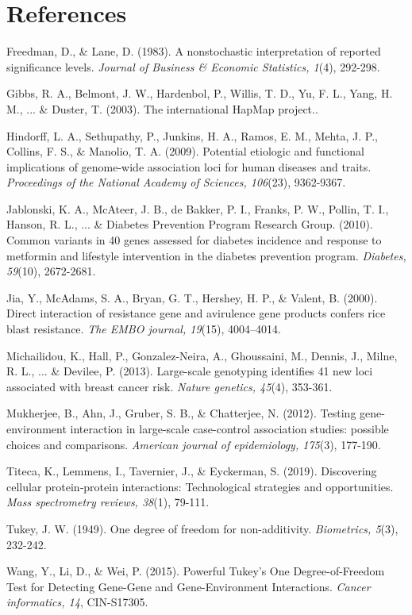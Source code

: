 \documentclass[12pt]{article}
\begin{document}
\section{References}
Freedman, D., \& Lane, D. (1983). A nonstochastic interpretation of reported significance levels. \textit{Journal of Business \& Economic Statistics, 1}(4), 292-298.

Gibbs, R. A., Belmont, J. W., Hardenbol, P., Willis, T. D., Yu, F. L., Yang, H. M., ... \& Duster, T. (2003). The international HapMap project..

Hindorff, L. A., Sethupathy, P., Junkins, H. A., Ramos, E. M., Mehta, J. P., Collins, F. S., \& Manolio, T. A. (2009). Potential etiologic and functional implications of genome-wide association loci for human diseases and traits. \textit{Proceedings of the National Academy of Sciences, 106}(23), 9362-9367.

Jablonski, K. A., McAteer, J. B., de Bakker, P. I., Franks, P. W., Pollin, T. I., Hanson, R. L., ... \& Diabetes Prevention Program Research Group. (2010). Common variants in 40 genes assessed for diabetes incidence and response to metformin and lifestyle intervention in the diabetes prevention program. \textit{Diabetes, 59}(10), 2672-2681.

Jia, Y., McAdams, S. A., Bryan, G. T., Hershey, H. P., \& Valent, B. (2000). Direct interaction of resistance gene and avirulence gene products confers rice blast resistance. \textit{The EMBO journal, 19}(15), 4004–4014.

Michailidou, K., Hall, P., Gonzalez-Neira, A., Ghoussaini, M., Dennis, J., Milne, R. L., ... \& Devilee, P. (2013). Large-scale genotyping identifies 41 new loci associated with breast cancer risk. \textit{Nature genetics, 45}(4), 353-361.

Mukherjee, B., Ahn, J., Gruber, S. B., \& Chatterjee, N. (2012). Testing gene-environment interaction in large-scale case-control association studies: possible choices and comparisons. \textit{American journal of epidemiology, 175}(3), 177-190.

Titeca, K., Lemmens, I., Tavernier, J., \& Eyckerman, S. (2019). Discovering cellular protein‐protein interactions: Technological strategies and opportunities. \textit{Mass spectrometry reviews, 38}(1), 79-111.

Tukey, J. W. (1949). One degree of freedom for non-additivity. \textit{Biometrics, 5}(3), 232-242.

Wang, Y., Li, D., \& Wei, P. (2015). Powerful Tukey's One Degree-of-Freedom Test for Detecting Gene-Gene and Gene-Environment Interactions. \textit{Cancer informatics, 14}, CIN-S17305.
\end{document}
